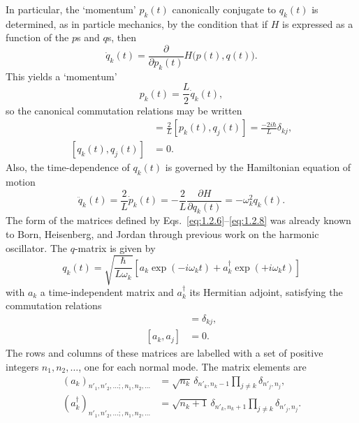 In particular, the `momentum' $p_k(t)$ canonically conjugate to $q_k(t)$ is
determined, as in particle mechanics, by the condition that if $H$ is expressed
as a function of the $p$s and $q$s, then
\[
  \dot q_k(t)=\frac{\partial}{\partial p_k(t)}H\bigl(p(t),q(t)\bigr).
\]
This yields a `momentum'
\begin{equation}
  p_k(t)=\frac{L}{2}\dot q_k(t),
  \tag{1.2.5}\label{eq:1.2.5}
\end{equation}
so the canonical commutation relations may be written
\begin{align}
  [\dot q_k(t),q_j(t)]
    &=\frac{2}{L}[p_k(t),q_j(t)]
    =\frac{-2i\hbar}{L}\delta_{kj},
  \tag{1.2.6}\label{eq:1.2.6}\\
  [q_k(t),q_j(t)]&=0.
  \tag{1.2.7}\label{eq:1.2.7}
\end{align}
Also, the time-dependence of $q_k(t)$ is governed by the Hamiltonian equation
of motion
\begin{equation}
  \ddot q_k(t)=\frac{2}{L}\dot p_k(t)
  =-\frac{2}{L}\frac{\partial H}{\partial q_k(t)}
  =-\omega_k^2q_k(t).
  \tag{1.2.8}\label{eq:1.2.8}
\end{equation}
The form of the matrices defined by Eqs.~\eqref{eq:1.2.6}--\eqref{eq:1.2.8} was already
known to Born, Heisenberg, and Jordan through previous work on the
harmonic oscillator. The $q$-matrix is given by
\begin{equation}
  q_k(t)=\sqrt{\frac{\hbar}{L\omega_k}}
  \left[a_k\exp(-i\omega_kt)+a_k^{\dagger}\exp(+i\omega_kt)\right]
  \tag{1.2.9}\label{eq:1.2.9}
\end{equation}
with $a_k$ a time-independent matrix and $a_k^{\dagger}$ its Hermitian adjoint,
satisfying the commutation relations
\begin{align}
  [a_k,a_j^{\dagger}]&=\delta_{kj},
  \tag{1.2.10}\label{eq:1.2.10}\\
  [a_k,a_j]&=0.
  \tag{1.2.11}\label{eq:1.2.11}
\end{align}
The rows and columns of these matrices are labelled with a set of positive
integers $n_1,n_2,\ldots$, one for each normal mode. The matrix elements are
\begin{align}
  (a_k)_{n'_1,n'_2,\ldots;,n_1,n_2,\ldots}
    &=\sqrt{n_k}\,\delta_{n'_k,n_k-1}
      \prod_{j\ne k}\delta_{n'_j,n_j},
  \tag{1.2.12}\label{eq:1.2.12}\\
  (a_k^{\dagger})_{n'_1,n'_2,\ldots;,n_1,n_2,\ldots}
    &=\sqrt{n_k+1}\,\delta_{n'_k,n_k+1}
      \prod_{j\ne k}\delta_{n'_j,n_j}.
  \tag{1.2.13}\label{eq:1.2.13}
\end{align}
